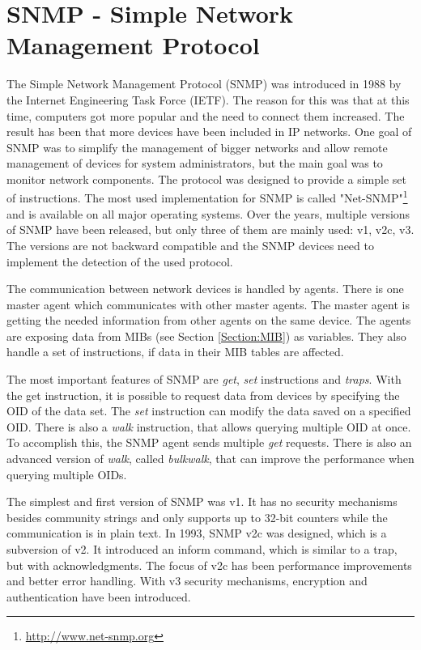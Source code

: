 \section{SNMP - Simple Network Management Protocol}
\label{Section:SNMP}

The Simple Network Management Protocol (SNMP) was introduced in 1988 by the  Internet Engineering Task Force (IETF). The reason for this was that at this time, computers got more popular and the need to connect them increased. The result has been that more devices have been included in IP networks. One goal of SNMP was to simplify the management of bigger networks and allow remote management of devices for system administrators, but the main goal was to monitor network components. The protocol was designed to provide a simple set of instructions. The most used implementation for SNMP is called "Net-SNMP"\footnote{\url{http://www.net-snmp.org}} and is available on all major operating systems. Over the years, multiple versions of SNMP have been released, but only three of them are mainly used: v1, v2c, v3. The versions are not backward compatible and the SNMP devices need to implement the detection of the used protocol.

\newpage
The communication between network devices is handled by agents. There is one master agent which communicates with other master agents. The master agent is getting the needed information from other agents on the same device. The agents are exposing data from MIBs (see Section \ref{Section:MIB}) as variables. They also handle a set of instructions, if data in their MIB tables are affected.

The most important features of SNMP are \textit{get}, \textit{set} instructions and \textit{traps}. With the get instruction, it is possible to request data from devices by specifying the OID of the data set. The \textit{set} instruction can modify the data saved on a specified OID. There is also a \textit{walk} instruction, that allows querying multiple OID at once. To accomplish this, the SNMP agent sends multiple \textit{get} requests. There is also an advanced version of \textit{walk}, called \textit{bulkwalk}, that can improve the performance when querying multiple OIDs.

The simplest and first version of SNMP was v1. It has no security mechanisms besides community strings and only supports up to 32-bit counters while the communication is in plain text. In 1993, SNMP v2c was designed, which is a subversion of v2. It introduced an inform command, which is similar to a trap, but with acknowledgments. The focus of v2c has been performance improvements and better error handling. With v3 security mechanisms, encryption and authentication have been introduced.

